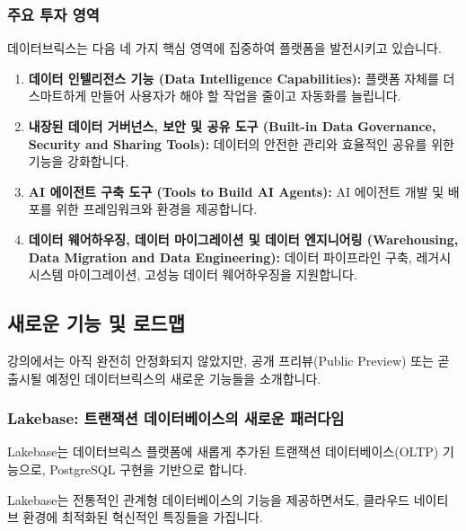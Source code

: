 \documentclass[11pt,a4paper]{article}
\theoremstyle{definition}
\begin{document}
\subsubsection{주요 투자 영역}
데이터브릭스는 다음 네 가지 핵심 영역에 집중하여 플랫폼을 발전시키고 있습니다.
\begin{enumerate}
    \item \textbf{데이터 인텔리전스 기능 (Data Intelligence Capabilities):} 플랫폼 자체를 더 스마트하게 만들어 사용자가 해야 할 작업을 줄이고 자동화를 늘립니다.
    \item \textbf{내장된 데이터 거버넌스, 보안 및 공유 도구 (Built-in Data Governance, Security and Sharing Tools):} 데이터의 안전한 관리와 효율적인 공유를 위한 기능을 강화합니다.
    \item \textbf{AI 에이전트 구축 도구 (Tools to Build AI Agents):} AI 에이전트 개발 및 배포를 위한 프레임워크와 환경을 제공합니다.
    \item \textbf{데이터 웨어하우징, 데이터 마이그레이션 및 데이터 엔지니어링 (Warehousing, Data Migration and Data Engineering):} 데이터 파이프라인 구축, 레거시 시스템 마이그레이션, 고성능 데이터 웨어하우징을 지원합니다.
\end{enumerate}

\subsection{새로운 기능 및 로드맵}

강의에서는 아직 완전히 안정화되지 않았지만, 공개 프리뷰(Public Preview) 또는 곧 출시될 예정인 데이터브릭스의 새로운 기능들을 소개합니다.

\subsubsection{Lakebase: 트랜잭션 데이터베이스의 새로운 패러다임}
Lakebase는 데이터브릭스 플랫폼에 새롭게 추가된 트랜잭션 데이터베이스(OLTP) 기능으로, PostgreSQL 구현을 기반으로 합니다.

\begin{tcolorbox}[summary={Lakebase의 핵심 특징}]
Lakebase는 전통적인 관계형 데이터베이스의 기능을 제공하면서도, 클라우드 네이티브 환경에 최적화된 혁신적인 특징들을 가집니다.
\end{tcolorbox}
\end{document}
